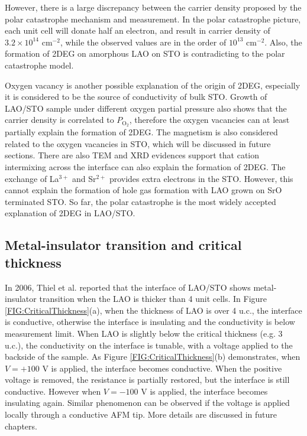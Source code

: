 \documentclass[pdflatex, sectionletters, 12pt]{pittetd}    %
\begin{document}
However, there is a large discrepancy between the carrier density proposed by the polar catastrophe mechanism and measurement. In the polar catastrophe picture, each unit cell will donate half an electron, and result in carrier density of $3.2 \times 10^{14}$ cm$^{-2}$, while the observed values are in the order of $10^{13}$ cm$^{-2}$. Also, the formation of 2DEG on amorphous LAO on STO is contradicting to the polar catastrophe model. 

Oxygen vacancy is another possible explanation of the origin of 2DEG\cite{kalabukhov2007effect}, especially it is considered to be the source of conductivity of bulk STO\cite{schooley1965dependence}. Growth of LAO/STO sample under different oxygen partial pressure also shows that the carrier density is correlated to $P_{\mathrm{O_2}}$, therefore the oxygen vacancies can at least partially explain the formation of 2DEG. The magnetism is also considered related to the oxygen vacancies in STO, which will be discussed in future sections. There are also TEM\cite{nakagawa2006some} and XRD\cite{willmott2007structural} evidences support that cation intermixing across the interface can also explain the formation of 2DEG. The exchange of La$^{3+}$ and Sr$^{2+}$ provides extra electrons in the STO. However, this cannot explain the formation of hole gas formation with LAO grown on SrO terminated STO. So far, the polar catastrophe is the most widely accepted explanation of 2DEG in LAO/STO.

\subsection{Metal-insulator transition and critical thickness}

In 2006, Thiel et al.\cite{thiel2006tunable} reported that the interface of LAO/STO shows metal-insulator transition when the LAO is thicker than 4 unit cells. In Figure \ref{FIG:CriticalThickness}(a), when the thickness of LAO is over 4 u.c., the interface is conductive, otherwise the interface is insulating and the conductivity is below measurement limit. When LAO is slightly below the critical thickness (e.g. 3 u.c.), the conductivity on the interface is tunable, with a voltage applied to the backside of the sample. As Figure \ref{FIG:CriticalThickness}(b) demonstrates, when $V = +100$ V is applied, the interface becomes conductive. When the positive voltage is removed, the resistance is partially restored, but the interface is still conductive. However when $V = -100$ V is applied, the interface becomes insulating again. Similar phenomenon can be observed if the voltage is applied locally through a conductive AFM tip. More details are discussed in future chapters. 
\end{document}
